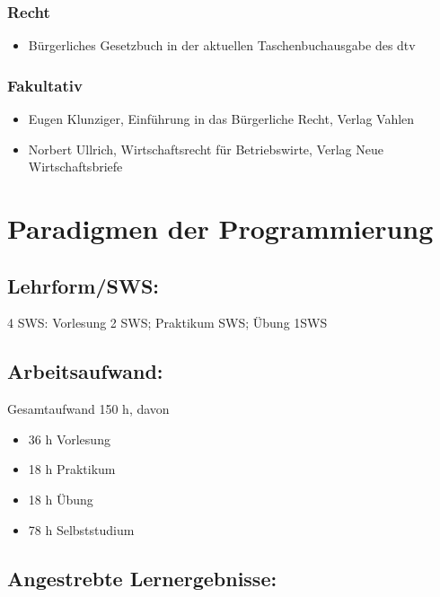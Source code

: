 \subsection{Recht}\label{recht-2}

\begin{itemize}
\tightlist
\item
  Bürgerliches Gesetzbuch in der aktuellen Taschenbuchausgabe des dtv
\end{itemize}

\subsection{Fakultativ}\label{fakultativ}

\begin{itemize}
\tightlist
\item
  Eugen Klunziger, Einführung in das Bürgerliche Recht, Verlag Vahlen
\item
  Norbert Ullrich, Wirtschaftsrecht für Betriebswirte, Verlag Neue
  Wirtschaftsbriefe
\end{itemize}

\chapter{Paradigmen der
Programmierung}\label{paradigmen-der-programmierung}

\section{Lehrform/SWS:}\label{lehrformsws-17}

4 SWS: Vorlesung 2 SWS; Praktikum SWS; Übung 1SWS

\section{Arbeitsaufwand:}\label{arbeitsaufwand-17}

Gesamtaufwand 150 h, davon

\begin{itemize}
\tightlist
\item
  36 h Vorlesung
\item
  18 h Praktikum
\item
  18 h Übung
\item
  78 h Selbststudium
\end{itemize}

\section{Angestrebte
Lernergebnisse:}\label{angestrebte-lernergebnisse-17}


